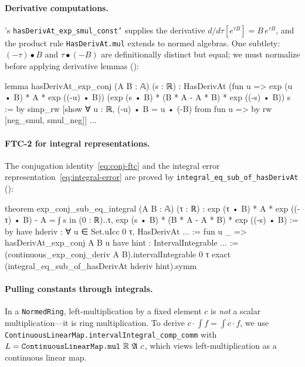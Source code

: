 \paragraph{Derivative computations.}
\Mathlib's \texttt{hasDerivAt\_exp\_smul\_const'} supplies the
derivative $d/d\tau[e^{\tau B}] = B\,e^{\tau B}$, and the
product rule \texttt{HasDerivAt.mul} extends to normed algebras.
One subtlety: $(-\tau) \bullet B$ and $\tau \bullet (-B)$ are
definitionally distinct but equal; we must normalize before
applying derivative lemmas
():

\begin{leancode}
lemma hasDerivAt_exp_conj (A B : 𝔸) (s : ℝ) :
    HasDerivAt
      (fun u => exp (u • B) * A * exp ((-u) • B))
      (exp (s • B) * (B * A - A * B) *
       exp ((-s) • B)) s := by
  simp_rw [show ∀ u : ℝ, (-u) • B = u • (-B)
    from fun u => by rw [neg_smul, smul_neg]]
  ...
\end{leancode}

\paragraph{FTC-2 for integral representations.}
The conjugation identity~\eqref{eq:conj-ftc} and the integral error
representation~\eqref{eq:integral-error} are proved by
\texttt{integral\_eq\_sub\_of\_hasDerivAt}
():

\begin{leancode}
theorem exp_conj_sub_eq_integral (A B : 𝔸) (τ : ℝ) :
    exp (τ • B) * A * exp ((-τ) • B) - A =
      ∫ s in (0 : ℝ)..τ,
        exp (s • B) * (B * A - A * B) *
        exp ((-s) • B) := by
  have hderiv : ∀ u ∈ Set.uIcc 0 τ,
      HasDerivAt ... := fun u _ =>
    hasDerivAt_exp_conj A B u
  have hint : IntervalIntegrable ... :=
    (continuous_exp_conj_deriv A B).intervalIntegrable 0 τ
  exact (integral_eq_sub_of_hasDerivAt hderiv hint).symm
\end{leancode}

\paragraph{Pulling constants through integrals.}
In a \texttt{NormedRing}, left-multiplication by a fixed element $c$ is
\emph{not} a scalar multiplication---it is ring multiplication. To derive
$c \cdot \int f = \int c \cdot f$, we use
\texttt{ContinuousLinearMap.intervalIntegral\_comp\_comm} with
$L = \texttt{ContinuousLinearMap.mul}\ \mathbb{R}\ \A\ c$, which views
left-multiplication as a continuous linear map.

